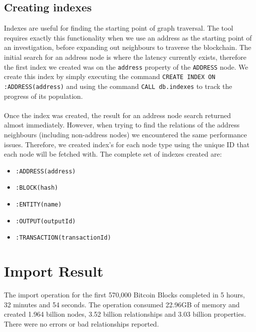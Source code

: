 \subsection{Creating indexes}
Indexes are useful for finding the starting point of graph traversal. The tool requires exactly this functionality when we use an address as the starting point of an investigation, before expanding out neighbours to traverse the blockchain. The initial search for an address node is where the latency currently exists, therefore the first index we created was on the \texttt{address} property of the \texttt{ADDRESS} node. We create this index by simply executing the command \texttt{CREATE INDEX ON :ADDRESS(address)} and using the command \texttt{CALL db.indexes} to track the progress of its population. 
\\\\
Once the index was created, the result for an address node search returned almost immediately. However, when trying to find the relations of the address neighbours (including non-address nodes) we encountered the same performance issues. Therefore, we created index's for each node type using the unique ID that each node will be fetched with. The complete set of indexes created are:
\begin{itemize}
    \item \texttt{:ADDRESS(address)}
    \item \texttt{:BLOCK(hash)}
    \item \texttt{:ENTITY(name)}
    \item \texttt{:OUTPUT(outputId)}
    \item \texttt{:TRANSACTION(transactionId)}
\end{itemize}

\section{Import Result}
The import operation for the first 570,000 Bitcoin Blocks completed in 5 hours, 32 minutes and 54 seconds. The operation consumed 22.96GB of memory and created 1.964 billion nodes, 3.52 billion relationships and 3.03 billion properties. There were no errors or bad relationships reported. 